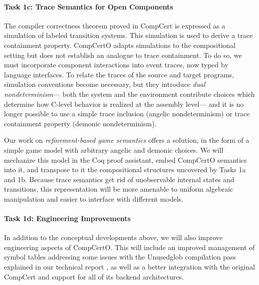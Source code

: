 \vspace*{-2ex}
\paragraph*{Task 1c: Trace Semantics for Open Components}
The compiler correctness theorem proved in CompCert
is expressed as a simulation of labeled transition systems.
This simulation is used to derive
a trace containment property.
CompCertO adapts simulations
to the compositional setting
but does not establish
an analogue to trace containment.
To do so,
we must incorporate component interactions
into event traces,
now typed by language interfaces.
To relate the traces of the source and target programs,
simulation conventions become necessary,
but they introduce
\emph{dual nondeterminism}---%
both the system and the environment contribute choices
which determine how C-level behavior is realized at the assembly level---%
and it is no longer possible to use
a simple trace inclusion (angelic nondeterminism)
or trace containment property (demonic nondeterminism).

Our work on \emph{refinement-based game semantics} \cite{koenig20}
offers a solution,
in the form of a simple game model
with arbitrary angelic and demonic choices.
We will mechanize this model in the Coq proof assistant,
embed CompCertO semantics into it,
and transpose to it the compositional structures uncovered by Tasks 1a and 1b.
Because trace semantics
get rid of unobservable internal states and transitions,
this representation will be more amenable to uniform algebraic manipulation
and easier to interface with different models.

\vspace*{-2ex}
\paragraph*{Task 1d: Engineering Improvements}

In addition to the conceptual developments above,
we will also improve engineering aspects of CompCertO.
This will include an improved management of symbol tables
addressing some issues with the \textsf{Unusedglob} compilation pass
explained in our technical report \cite[\S{}A.3]{compcerto21tr},
as well as a better integration with the original CompCert
and support for all of its backend architectures.

